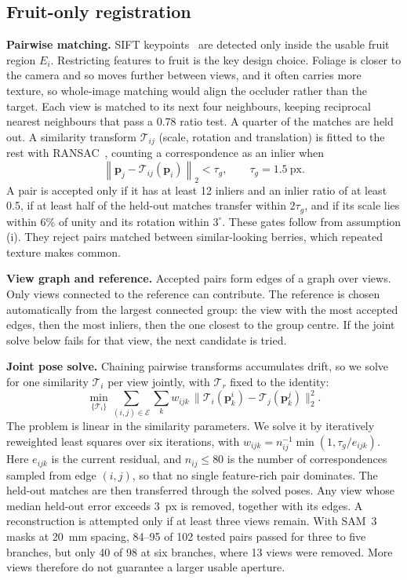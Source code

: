 \subsection{Fruit-only registration}\label{sec:registration}
\textbf{Pairwise matching.} SIFT keypoints~\cite{lowe2004} are detected only inside the usable fruit region $E_i$. Restricting features to fruit is the key design choice. Foliage is closer to the camera and so moves further between views, and it often carries more texture, so whole-image matching would align the occluder rather than the target. Each view is matched to its next four neighbours, keeping reciprocal nearest neighbours that pass a 0.78 ratio test. A quarter of the matches are held out. A similarity transform $\mathcal{T}_{ij}$ (scale, rotation and translation) is fitted to the rest with RANSAC~\cite{fischler1981}, counting a correspondence as an inlier when
\begin{equation}
 \left\|\mathbf{p}_j - \mathcal{T}_{ij}(\mathbf{p}_i)\right\|_2 < \tau_g, \qquad \tau_g = 1.5~\text{px}.
 \label{eq:ransac}
\end{equation}
A pair is accepted only if it has at least 12 inliers and an inlier ratio of at least 0.5, if at least half of the held-out matches transfer within $2\tau_g$, and if its scale lies within 6\% of unity and its rotation within $3^\circ$. These gates follow from assumption (i). They reject pairs matched between similar-looking berries, which repeated texture makes common.

\textbf{View graph and reference.} Accepted pairs form edges of a graph over views. Only views connected to the reference can contribute. The reference is chosen automatically from the largest connected group: the view with the most accepted edges, then the most inliers, then the one closest to the group centre. If the joint solve below fails for that view, the next candidate is tried.

\textbf{Joint pose solve.} Chaining pairwise transforms accumulates drift, so we solve for one similarity $\mathcal{T}_i$ per view jointly, with $\mathcal{T}_r$ fixed to the identity:
\begin{equation}
 \min_{\{\mathcal{T}_i\}} \sum_{(i,j)\in\mathcal{E}} \sum_{k}
 w_{ijk}\,\big\|\mathcal{T}_i(\mathbf{p}^{i}_k) - \mathcal{T}_j(\mathbf{p}^{j}_k)\big\|_2^2 .
 \label{eq:joint}
\end{equation}
The problem is linear in the similarity parameters. We solve it by iteratively reweighted least squares over six iterations, with $w_{ijk}=n_{ij}^{-1}\min(1,\tau_g/e_{ijk})$. Here $e_{ijk}$ is the current residual, and $n_{ij}\le 80$ is the number of correspondences sampled from edge $(i,j)$, so that no single feature-rich pair dominates. The held-out matches are then transferred through the solved poses. Any view whose median held-out error exceeds 3~px is removed, together with its edges. A reconstruction is attempted only if at least three views remain. With SAM~3 masks at 20~mm spacing, 84--95 of 102 tested pairs passed for three to five branches, but only 40 of 98 at six branches, where 13 views were removed. More views therefore do not guarantee a larger usable aperture.

